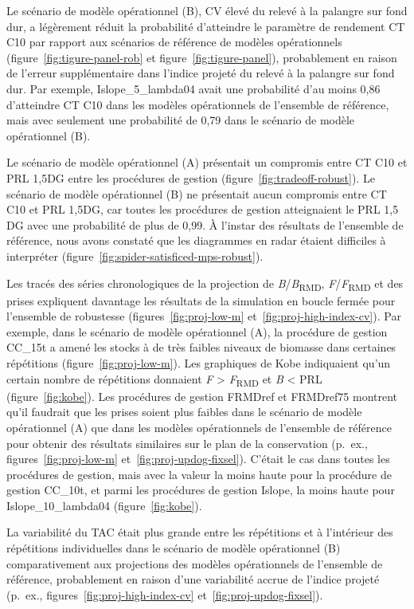 \documentclass[french,11pt]{book}
\begin{document}
Le scénario de modèle opérationnel (B), CV élevé du relevé à la palangre sur fond dur, a légèrement réduit la probabilité d'atteindre le paramètre de rendement CT C10 par rapport aux scénarios de référence de modèles opérationnels (figure~\ref{fig:tigure-panel-rob} et figure~\ref{fig:tigure-panel}), probablement en raison de l'erreur supplémentaire dans l'indice projeté du relevé à la palangre sur fond dur. Par exemple, Islope\_5\_lambda04 avait une probabilité d'au moins 0,86 d'atteindre CT C10 dans les modèles opérationnels de l'ensemble de référence, mais avec seulement une probabilité de 0,79 dans le scénario de modèle opérationnel (B).

Le scénario de modèle opérationnel (A) présentait un compromis entre CT C10 et PRL 1,5DG entre les procédures de gestion (figure~\ref{fig:tradeoff-robust}). Le scénario de modèle opérationnel (B) ne présentait aucun compromis entre CT C10 et PRL 1,5DG, car toutes les procédures de gestion atteignaient le PRL 1,5 DG avec une probabilité de plus de 0,99. À l'instar des résultats de l'ensemble de référence, nous avons constaté que les diagrammes en radar étaient difficiles à interpréter (figure~\ref{fig:spider-satisficed-mps-robust}).

Les tracés des séries chronologiques de la projection de \emph{B}/\emph{B}\textsubscript{RMD}, \emph{F}/\emph{F}\textsubscript{RMD} et des prises expliquent davantage les résultats de la simulation en boucle fermée pour l'ensemble de robustesse (figures~\ref{fig:proj-low-m} et~\ref{fig:proj-high-index-cv}). Par exemple, dans le scénario de modèle opérationnel (A), la procédure de gestion CC\_15t a amené les stocks à de très faibles niveaux de biomasse dans certaines répétitions (figure~\ref{fig:proj-low-m}). Les graphiques de Kobe indiquaient qu'un certain nombre de répétitions donnaient \emph{F} \textgreater{} \emph{F}\textsubscript{RMD} et \emph{B} \textless{} PRL (figure~\ref{fig:kobe}). Les procédures de gestion FRMDref et FRMDref75 montrent qu'il faudrait que les prises soient plus faibles dans le scénario de modèle opérationnel (A) que dans les modèles opérationnels de l'ensemble de référence pour obtenir des résultats similaires sur le plan de la conservation (p.~ex., figures~\ref{fig:proj-low-m} et~\ref{fig:proj-updog-fixsel}). C'était le cas dans toutes les procédures de gestion, mais avec la valeur la moins haute pour la procédure de gestion CC\_10t, et parmi les procédures de gestion Islope, la moins haute pour Islope\_10\_lambda04 (figure~\ref{fig:kobe}).

La variabilité du TAC était plus grande entre les répétitions et à l'intérieur des répétitions individuelles dans le scénario de modèle opérationnel (B) comparativement aux projections des modèles opérationnels de l'ensemble de référence, probablement en raison d'une variabilité accrue de l'indice projeté (p.~ex., figures~\ref{fig:proj-high-index-cv} et~\ref{fig:proj-updog-fixsel}).
\end{document}
